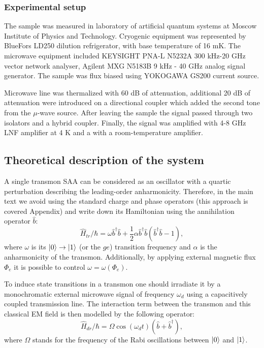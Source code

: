 \documentclass[%
 aip,
 amsmath,amssymb,
 reprint,%
]{revtex4-1}
\begin{document}
\subsubsection{Experimental setup}
The sample was measured in laboratory of artificial quantum systems at Moscow Institute of Physics and Technology. Cryogenic equipment was
represented by BlueFors LD250 dilution refrigerator, with base temperature of 16 mK. The microwave equipment included KEYSIGHT PNA-L N5232A 300 kHz-20 GHz vector network analyser, Agilent MXG N5183B 9 kHz - 40 GHz analog signal generator. The sample was 
flux biased using YOKOGAWA GS200 current source.

Microwave line was thermalized with 60 dB of attenuation, additional 20 dB of attenuation were introduced on a directional coupler which added the second tone from the $\mu$-wave source. After leaving the sample the signal passed through two isolators and a hybrid coupler. Finally, the signal was amplified with 4-8 GHz LNF amplifier at 4 K and a with a room-temperature amplifier.



\subsection{Theoretical description of the system}

A single transmon SAA can be considered as an oscillator with a quartic perturbation describing the leading-order anharmonicity. Therefore, in the main text we avoid using the standard charge and phase operators (this approach is covered Appendix) and write down its Hamiltonian using the annihilation operator $\hat b$:
\begin{equation}
\hat H_{tr}/\hbar = \omega \hat b^{\dagger}\hat b +\frac{1}{2}\alpha \hat b^{\dagger}\hat b(\hat b^{\dagger}\hat b-1),
\end{equation}
where $\omega$ is its $\ket{0}\rightarrow\ket{1}$ (or the  $ge$) transition frequency and $\alpha$ is the anharmonicity of the transmon. Additionally, by applying external magnetic flux $\Phi_e$ it is possible to control $\omega = \omega(\Phi_e)$\cite{koch2007charge}.


To induce state transitions in a transmon one should irradiate it by a monochromatic external microwave signal of frequency $\omega_d$ using a capacitively coupled transmission line. The interaction term between the transmon and this classical EM field is then modelled by the following operator: 
\begin{equation}
\hat H_{dr}/\hbar = \Omega\cos(\omega_d t)(\hat b+\hat b^{\dagger}),
\end{equation}
where $\Omega$ stands for the frequency of the Rabi oscillations between $\ket{0}$ and $\ket{1}$.
\end{document}

